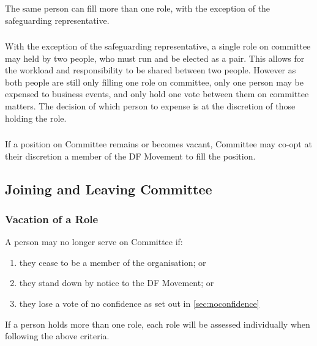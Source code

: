 \documentclass[a4paper, 11pt]{report}
\begin{document}
\subsubsection{}
\label{sec:moreroles}
The same person can fill more than one role, with the exception of the safeguarding representative.

\subsubsection{}
\label{sec:jobshares}
With the exception of the safeguarding representative, a single role on committee may held by two people, who must run and be elected as a pair. This allows for the workload and responsibility to be shared between two people. However as both people are still only filling one role on committee, only one person may be expensed to business events, and only hold one vote between them on committee matters. The decision of which person to expense is at the discretion of those holding the role.

\subsubsection{}
If a position on Committee remains or becomes vacant, Committee may co-opt at their discretion a member of the DF Movement to fill the position.

\subsection{Joining and Leaving Committee}
\label{sec:joiningleaving}

\subsubsection{Vacation of a Role}
A person may no longer serve on Committee if:
\begin{enumerate}[\hspace{0.5cm}(a)]
\item they cease to be a member of the organisation; or
\item they stand down by notice to the DF Movement; or
\item they lose a vote of no confidence as set out in \ref{sec:noconfidence}
\end{enumerate}

If a person holds more than one role, each role will be assessed individually when following the above criteria.
\end{document}
